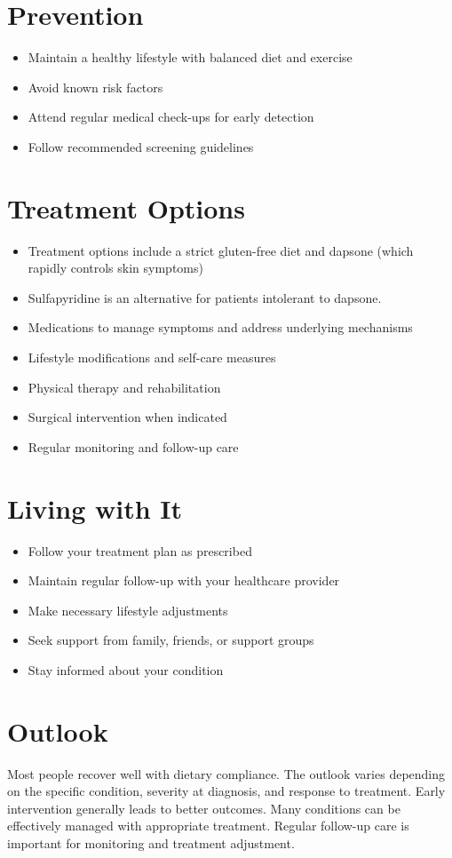 \section{Prevention}
\begin{itemize}[noitemsep]
  \item Maintain a healthy lifestyle with balanced diet and exercise
  \item Avoid known risk factors
  \item Attend regular medical check-ups for early detection
  \item Follow recommended screening guidelines
\end{itemize}
\section{Treatment Options}
\begin{itemize}[noitemsep]
  \item Treatment options include a strict gluten-free diet and dapsone (which rapidly controls skin symptoms)
  \item Sulfapyridine is an alternative for patients intolerant to dapsone.
  \item Medications to manage symptoms and address underlying mechanisms
  \item Lifestyle modifications and self-care measures
  \item Physical therapy and rehabilitation
  \item Surgical intervention when indicated
  \item Regular monitoring and follow-up care
\end{itemize}
\section{Living with It}
\begin{itemize}[noitemsep]
  \item Follow your treatment plan as prescribed
  \item Maintain regular follow-up with your healthcare provider
  \item Make necessary lifestyle adjustments
  \item Seek support from family, friends, or support groups
  \item Stay informed about your condition
\end{itemize}
\section{Outlook}
Most people recover well with dietary compliance. The outlook varies depending on the specific condition, severity at diagnosis, and response to treatment. Early intervention generally leads to better outcomes. Many conditions can be effectively managed with appropriate treatment. Regular follow-up care is important for monitoring and treatment adjustment.
